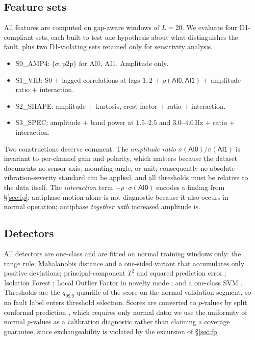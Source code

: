 \documentclass[twocolumn,10pt]{article}
\begin{document}
\subsection{Feature sets}

All features are computed on gap-aware windows of $L=20$. We evaluate four
D1-compliant sets, each built to test one hypothesis about what distinguishes
the fault, plus two D1-violating sets retained only for sensitivity analysis.

\begin{itemize}\itemsep1pt
\item \textsf{S0\_AMP4}: $\{\sigma, \text{p2p}\}$ for \textsf{AI0}, \textsf{AI1}. Amplitude only.
\item \textsf{S1\_VIB}: \textsf{S0} $+$ lagged correlations at lags $1,2$ $+$
$\rho(\textsf{AI0},\textsf{AI1})$ $+$ amplitude ratio $+$ interaction.
\item \textsf{S2\_SHAPE}: amplitude $+$ kurtosis, crest factor $+$ ratio $+$ interaction.
\item \textsf{S3\_SPEC}: amplitude $+$ band power at $1.5$--$2.5$ and $3.0$--$4.0$\,Hz $+$ ratio $+$ interaction.
\end{itemize}

Two constructions deserve comment. The \emph{amplitude ratio}
$\sigma(\textsf{AI0})/\sigma(\textsf{AI1})$ is invariant to per-channel gain and
polarity, which matters because the dataset documents no sensor axis, mounting
angle, or unit; consequently no absolute vibration-severity standard can be
applied, and all thresholds must be relative to the data itself. The
\emph{interaction} term $-\rho\cdot\sigma(\textsf{AI0})$ encodes a finding from
\S\ref{sec:fp}: antiphase motion alone is not diagnostic because it also occurs
in normal operation; antiphase \emph{together with} increased amplitude is.

\subsection{Detectors}

All detectors are one-class and are fitted on normal training windows only:
the range rule; Mahalanobis distance and a one-sided variant that accumulates
only positive deviations; principal-component $T^2$ and squared prediction
error \citep{jackson1979control,macgregor1995statistical}; Isolation Forest
\citep{liu2008isolation}; Local Outlier Factor in novelty mode
\citep{breunig2000lof}; and a one-class SVM \citep{scholkopf2001estimating}.
Thresholds are the $q_{99.9}$ quantile of the score on the normal validation
segment, so no fault label enters threshold selection. Scores are converted to
$p$-values by split conformal prediction \citep{vovk2005algorithmic,
laxhammar2015inductive}, which requires only normal data; we use the
uniformity of normal $p$-values as a calibration diagnostic rather than
claiming a coverage guarantee, since exchangeability is violated by the
excursion of \S\ref{sec:fp}.
\end{document}
